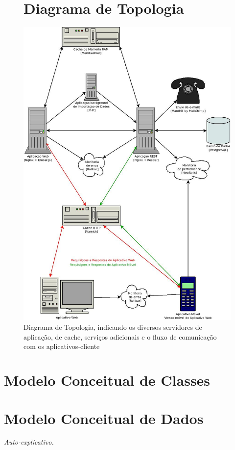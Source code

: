 \documentclass[a4paper]{abnt}
\begin{document}
\begin{figure}
	\section{Diagrama de Topologia}
	\centering
	\includegraphics[scale=0.5]{diagramas/topologia.jpg}
	\caption{Diagrama de Topologia, indicando os diversos servidores de aplicaç\~ao, de cache, serviços adicionais e o fluxo de comunicaç\~ao com os aplicativos-cliente}
\end{figure}


\section{Modelo Conceitual de Classes}

\section{Modelo Conceitual de Dados}
\emph{Auto-explicativo.}

\printbibliography
\end{document}
